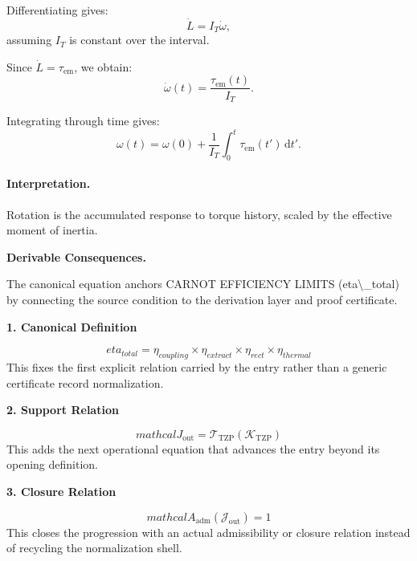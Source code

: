 Differentiating gives:
\begin{equation}
\dot{L}
=
I_T\dot{\omega},
\end{equation}
assuming $I_T$ is constant over the interval.

Since $\dot{L}=\tau_{\mathrm{em}}$, we obtain:
\begin{equation}
\dot{\omega}(t)
=
\frac{\tau_{\mathrm{em}}(t)}{I_T}.
\end{equation}

Integrating through time gives:
\begin{equation}
\boxed{
\omega(t)
=
\omega(0)
+
\frac{1}{I_T}
\int_0^t
\tau_{\mathrm{em}}(t')
\,\mathrm{d}t' .
}
\end{equation}

\paragraph{Interpretation.}
Rotation is the accumulated response to torque history, scaled by the effective moment of inertia.

\par\vspace{0.35em}
\noindent\textbf{Derivable Consequences.}\quad
\begingroup
\footnotesize
\raggedright
The canonical equation anchors CARNOT EFFICIENCY LIMITS (eta\textbackslash{}\_total) by connecting the source condition to the derivation layer and proof certificate.
\par\endgroup

\noindent\textbf{1. Canonical Definition}\par
\[
eta_{total} = \eta_{coupling} \times \eta_{extract} \times \eta_{rect} \times \eta_{thermal}
\]
\noindent This fixes the first explicit relation carried by the entry rather than a generic certificate record normalization.\par
\noindent\textbf{2. Support Relation}\par
\[
mathcal{J}_{\mathrm{out}} = \mathcal{T}_{\mathrm{TZP}}\!\left(\mathcal{K}_{\mathrm{TZP}}\right)
\]
\noindent This adds the next operational equation that advances the entry beyond its opening definition.\par
\noindent\textbf{3. Closure Relation}\par
\[
mathcal{A}_{\mathrm{adm}}\!\left(\mathcal{J}_{\mathrm{out}}\right)=1
\]
\noindent This closes the progression with an actual admissibility or closure relation instead of recycling the normalization shell.\par

